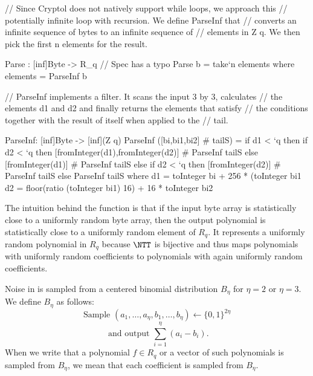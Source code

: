 \begin{code}
  // Since Cryptol does not natively support while loops, we approach this
  // potentially infinite loop with recursion. We define ParseInf that 
  // converts an infinite sequence of bytes to an infinite sequence of
  // elements in Z q. We then pick the first n elements for the result.

  Parse : [inf]Byte -> R_q // Spec has a typo
  Parse b = take`{n} elements
      where elements = ParseInf b

  // ParseInf implements a filter. It scans the input 3 by 3, calculates
  // the elements d1 and d2 and finally returns the elements that satisfy 
  // the conditions together with the result of itself when applied to the
  // tail.

  ParseInf: [inf]Byte -> [inf](Z q)
  ParseInf ([bi,bi1,bi2] # tailS) =
      if d1 < `q then
          if d2 < `q then
              [fromInteger(d1),fromInteger(d2)] # ParseInf tailS
          else
              [fromInteger(d1)] # ParseInf tailS
      else
          if d2 < `q then
              [fromInteger(d2)] # ParseInf tailS
          else
              ParseInf tailS
      where
          d1 = toInteger bi + 256 * (toInteger bi1 %
          d2 = floor(ratio (toInteger bi1) 16) + 16 * toInteger bi2
\end{code}

The intuition behind the function \Parse is that if the input byte array
is statistically close to a uniformly random byte array, then the output
polynomial is statistically close to a uniformly random element of $R_q$. 
It represents a uniformly random polynomial in $R_q$ because $\NTT$ is bijective and thus maps polynomials with uniformly random coefficients to polynomials with again uniformly random coefficients. 


Noise in \Kyber is sampled from a centered binomial distribution $B_{\eta}$
for $\eta=2$ or $\eta=3$. We define $B_\eta$ as follows:
\[
\text{Sample } (a_1,\ldots,a_\eta,b_1,\ldots,b_\eta)\gets \{0,1\}^{2\eta}\]
\[\text{ and output }\sum_{i=1}^\eta (a_i-b_i).\]
When we write that a polynomial $f \in R_q$ or a vector of such polynomials
is sampled from $B_\eta$, we mean that each coefficient is sampled from $B_\eta$.

